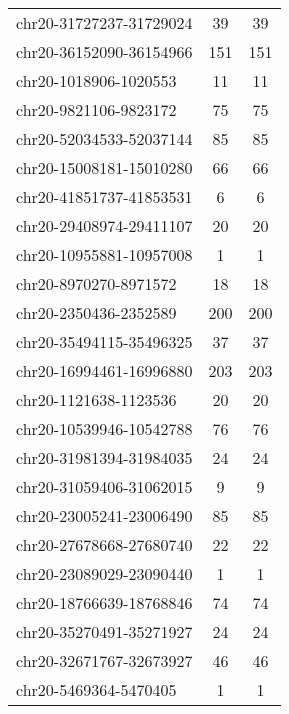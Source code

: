 \begin{longtable}{lSS}
	chr20-31727237-31729024 & 39   & 39                              \\
	chr20-36152090-36154966 & 151  & 151                             \\
	chr20-1018906-1020553   & 11   & 11                              \\
	chr20-9821106-9823172   & 75   & 75                              \\
	chr20-52034533-52037144 & 85   & 85                              \\
	chr20-15008181-15010280 & 66   & 66                              \\
	chr20-41851737-41853531 & 6    & 6                               \\
	chr20-29408974-29411107 & 20   & 20                              \\
	chr20-10955881-10957008 & 1    & 1                               \\
	chr20-8970270-8971572   & 18   & 18                              \\
	chr20-2350436-2352589   & 200  & 200                             \\
	chr20-35494115-35496325 & 37   & 37                              \\
	chr20-16994461-16996880 & 203  & 203                             \\
	chr20-1121638-1123536   & 20   & 20                              \\
	chr20-10539946-10542788 & 76   & 76                              \\
	chr20-31981394-31984035 & 24   & 24                              \\
	chr20-31059406-31062015 & 9    & 9                               \\
	chr20-23005241-23006490 & 85   & 85                              \\
	chr20-27678668-27680740 & 22   & 22                              \\
	chr20-23089029-23090440 & 1    & 1                               \\
	chr20-18766639-18768846 & 74   & 74                              \\
	chr20-35270491-35271927 & 24   & 24                              \\
	chr20-32671767-32673927 & 46   & 46                              \\
	chr20-5469364-5470405   & 1    & 1                               \\

\end{longtable}
